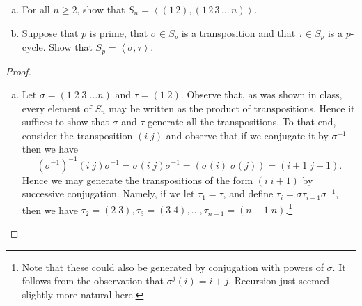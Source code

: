 \documentclass[10pt]{amsart}
\begin{document}
\begin{ex2}
  \begin{enumerate}[(a)]
    \item
      For all $n \geq 2$, show that $S_n = \left<(1\, 2), (1\, 2\, 3\, \ldots\, n)\right>$.
    \item
      Suppose that $p$ is prime, that $\sigma \in S_p$ is a transposition and that $\tau \in S_p$ is a $p$-cycle.
      Show that $S_p = \left<\sigma, \tau\right>$.
  \end{enumerate}
  \begin{proof}
    \begin{enumerate}[(a)]
    \item
      Let $\sigma = \left(1\; 2\; 3\; \ldots n\right)$ and $\tau = \left(1\; 2\right)$.
      Observe that, as was shown in class, every element of $S_n$ may be written as the product of transpositions.
      Hence it suffices to show that $\sigma$ and $\tau$ generate all the transpositions.
      To that end, consider the transposition $\left(i\; j\right)$ and observe that if we conjugate it by $\sigma^{-1}$ then we have
      $$\left(\sigma^{-1}\right)^{-1} \left(i\; j\right) \sigma^{-1} = \sigma \left(i\; j\right) \sigma^{-1} = \left(\sigma\left(i\right)\; \sigma\left(j\right)\right) = \left(i+1\; j+1\right).$$
      Hence we may generate the transpositions of the form $\left(i\; i+1\right)$ by successive conjugation.
      Namely, if we let $\tau_1 = \tau$, and define $\tau_i = \sigma\tau_{i-1}\sigma^{-1}$, then we have $\tau_2 = \left(2\; 3\right), \tau_3 = \left(3\; 4\right), \ldots, \tau_{n-1} = \left(n-1\; n\right)$.\footnote[1]{Note that these could also be generated by conjugation with powers of $\sigma$.  It follows from the observation that $\sigma^j(i) = i+j$.  Recursion just seemed slightly more natural here.}


\end{enumerate}
\end{proof}
\end{ex2}
\end{document}
